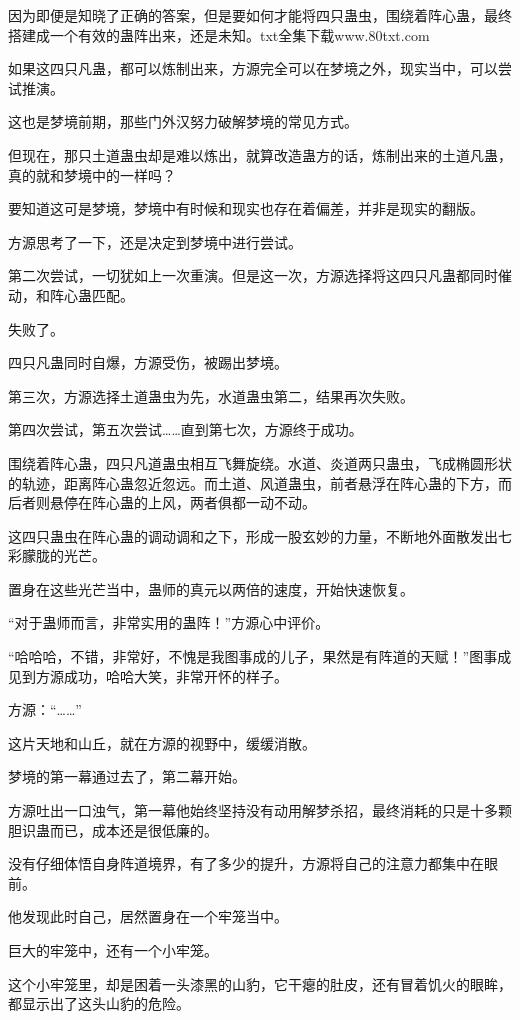 \begin{this_body}
因为即便是知晓了正确的答案，但是要如何才能将四只蛊虫，围绕着阵心蛊，最终搭建成一个有效的蛊阵出来，还是未知。txt全集下载www.80txt.com

如果这四只凡蛊，都可以炼制出来，方源完全可以在梦境之外，现实当中，可以尝试推演。

这也是梦境前期，那些门外汉努力破解梦境的常见方式。

但现在，那只土道蛊虫却是难以炼出，就算改造蛊方的话，炼制出来的土道凡蛊，真的就和梦境中的一样吗？

要知道这可是梦境，梦境中有时候和现实也存在着偏差，并非是现实的翻版。

方源思考了一下，还是决定到梦境中进行尝试。

第二次尝试，一切犹如上一次重演。但是这一次，方源选择将这四只凡蛊都同时催动，和阵心蛊匹配。

失败了。

四只凡蛊同时自爆，方源受伤，被踢出梦境。

第三次，方源选择土道蛊虫为先，水道蛊虫第二，结果再次失败。

第四次尝试，第五次尝试……直到第七次，方源终于成功。

围绕着阵心蛊，四只凡道蛊虫相互飞舞旋绕。水道、炎道两只蛊虫，飞成椭圆形状的轨迹，距离阵心蛊忽近忽远。而土道、风道蛊虫，前者悬浮在阵心蛊的下方，而后者则悬停在阵心蛊的上风，两者俱都一动不动。

这四只蛊虫在阵心蛊的调动调和之下，形成一股玄妙的力量，不断地外面散发出七彩朦胧的光芒。

置身在这些光芒当中，蛊师的真元以两倍的速度，开始快速恢复。

“对于蛊师而言，非常实用的蛊阵！”方源心中评价。

“哈哈哈，不错，非常好，不愧是我图事成的儿子，果然是有阵道的天赋！”图事成见到方源成功，哈哈大笑，非常开怀的样子。

方源：“……”

这片天地和山丘，就在方源的视野中，缓缓消散。

梦境的第一幕通过去了，第二幕开始。

方源吐出一口浊气，第一幕他始终坚持没有动用解梦杀招，最终消耗的只是十多颗胆识蛊而已，成本还是很低廉的。

没有仔细体悟自身阵道境界，有了多少的提升，方源将自己的注意力都集中在眼前。

他发现此时自己，居然置身在一个牢笼当中。

巨大的牢笼中，还有一个小牢笼。

这个小牢笼里，却是困着一头漆黑的山豹，它干瘪的肚皮，还有冒着饥火的眼眸，都显示出了这头山豹的危险。


\end{this_body}
